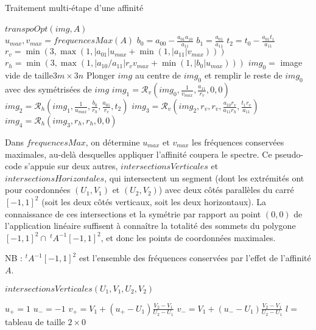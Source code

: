    \begin{algorithme}
    \caption{Traitement multi-étape d'une affinité}
    $transpoOpt(img,A)$\;\ \\
    $u_{max}, v_{max} = frequencesMax(A)$\;
	$b_0 = a_{00}-\frac{a_{01}a_{10}}{a_{11}}$\;
	$b_1 = \frac{a_{01}}{a_{11}}$\;
	$t_2 = t_0 - \frac{a_{01}t_1}{a_{11}}$\;
	$r_v = \min(3,\max (1,|a_{01}|u_{max}+\min (1,|a_{11}|v_{max})))$\;
	$r_h = \min(3,\max (1,|a_{10}/a_{11}|r_vv_{max}+\min (1,|b_0|u_{max})))$\;
	$img_0 =$ image vide de taille$3m \times 3n$\;
	Plonger $img$ au centre de $img_0$ et remplir le reste de $img_0$ avec des symétrisées de $img$\;
	$img_1 = \mathcal{R}_v(img_0,\frac{1}{v_{max}},\frac{a_{11}}{r_v},0,0)$\;
	$img_2 = \mathcal{R}_h(img_1,\frac{1}{u_{max}},\frac{b_0}{r_h},\frac{a_{01}}{r_v},t_2)$\;
	$img_3 = \mathcal{R}_v(img_2,r_v,r_v,\frac{a_{10}r_v}{a_{11}r_h},\frac{t_1r_v}{a_{11}})$\;
	$img_4 = \mathcal{R}_h(img_3,r_h,r_h,0,0)$\;
   \end{algorithme}










  Dans $frequencesMax$, on détermine $u_{max}$ et $v_{max}$ les fréquences conservées maximales, au-delà desquelles appliquer l'affinité coupera le spectre. Ce pseudo-code s'appuie sur deux autres, $intersectionsVerticales$ et $intersectionsHorizontales$, qui intersectent un segment (dont les extrémités ont pour coordonnées $(U_1,V_1)$ et $(U_2,V_2)$) avec deux côtés parallèles du carré $[-1,1]^2$ (soit les deux côtés verticaux, soit les deux horizontaux). La connaissance de ces intersections et la symétrie par rapport au point $(0,0)$ de l'application linéaire suffisent à connaître la totalité des sommets du polygone $[-1,1]^2 \cap \ ^t\!\!A^{-1}[-1,1]^2$, et donc les points de coordonnées maximales.
  
  NB : $^t\!\!A^{-1}[-1,1]^2$ est l'ensemble des fréquences conservées par l'effet de l'affinité $A$.
  
  \begin{algorithme}
   \caption{$intersectionsVerticales(U_1,V_1,U_2,V_2)$}
   $u_+ = 1$\;
   $u_- = -1$\;
   $v_+ = V_1+(u_+-U_1)\frac{V_2-V_1}{U_2-U_1}$\;
   $v_- = V_1+(u_--U_1)\frac{V_2-V_1}{U_2-U_1}$\;
   $l =$ tableau de taille $2 \times 0$\;
  \end{algorithme}










